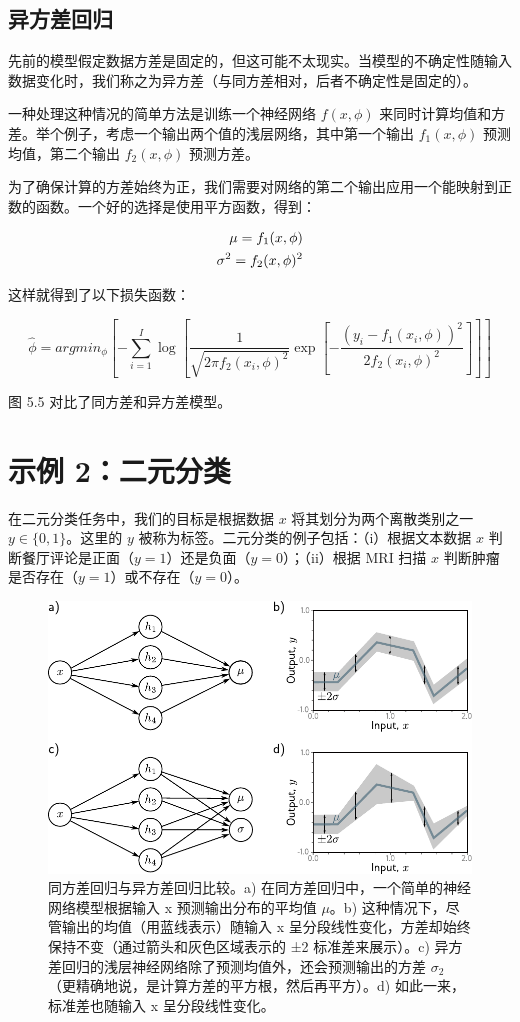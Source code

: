 \documentclass[lang=cn,newtx,10pt,scheme=chinese]{elegantbook}
\begin{document}
\subsection{异方差回归}

先前的模型假定数据方差是固定的，但这可能不太现实。当模型的不确定性随输入数据变化时，我们称之为异方差（与同方差相对，后者不确定性是固定的）。

一种处理这种情况的简单方法是训练一个神经网络 \(f(x, \phi)\) 来同时计算均值和方差。举个例子，考虑一个输出两个值的浅层网络，其中第一个输出 \(f_1(x, \phi)\) 预测均值，第二个输出 \(f_2(x, \phi)\) 预测方差。

为了确保计算的方差始终为正，我们需要对网络的第二个输出应用一个能映射到正数的函数。一个好的选择是使用平方函数，得到：


\begin{align}
	\mu = f_1(x, \phi)  \notag \\
	\sigma^2 = f_2(x, \phi)^2  
\end{align}

这样就得到了以下损失函数：

\begin{equation}
	\hat{\phi} = argmin_{\phi} \left[ -\sum_{i=1}^{I} \log \left[ \frac{1}{\sqrt{2\pi f_2(x_i, \phi)^2}} \exp \left[ -\frac{(y_i - f_1(x_i, \phi))^2}{2f_2(x_i, \phi)^2} \right] \right] \right] 
\end{equation}

图 5.5 对比了同方差和异方差模型。

\section{示例 2：二元分类}

在二元分类任务中，我们的目标是根据数据 \(x\) 将其划分为两个离散类别之一 \(y \in \{0, 1\}\)。这里的 \(y\) 被称为标签。二元分类的例子包括：（i）根据文本数据 \(x\) 判断餐厅评论是正面（\(y = 1\)）还是负面（\(y = 0\)）；（ii）根据 MRI 扫描 \(x\) 判断肿瘤是否存在（\(y = 1\)）或不存在（\(y = 0\)）。

\begin{figure}[ht!]
	\centering
	\includegraphics[width=0.7\linewidth]{PDFFigures/UDLChap5PDF/LossHeteroscedastic.pdf}
	\caption{同方差回归与异方差回归比较。a) 在同方差回归中，一个简单的神经网络模型根据输入 x 预测输出分布的平均值 \(\mu\)。b) 这种情况下，尽管输出的均值（用蓝线表示）随输入 x 呈分段线性变化，方差却始终保持不变（通过箭头和灰色区域表示的 ±2 标准差来展示）。c) 异方差回归的浅层神经网络除了预测均值外，还会预测输出的方差 \(\sigma_2\)（更精确地说，是计算方差的平方根，然后再平方）。d) 如此一来，标准差也随输入 x 呈分段线性变化。}
\end{figure}
\end{document}
